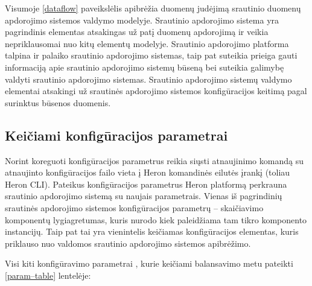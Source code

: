 \documentclass{VUMIFPSbakalaurinis}
\begin{document}
Visumoje \ref{dataflow} paveikslėlis apibrėžia duomenų judėjimą srautinio duomenų apdorojimo sistemos valdymo modelyje. Srautinio apdorojimo sistema yra pagrindinis elementas atsakingas už patį duomenų apdorojimą ir veikia nepriklausomai nuo kitų elementų modelyje. Srautinio apdorojimo platforma talpina ir palaiko srautinio apdorojimo sistemas, taip pat suteikia prieiga gauti informaciją apie srautinio apdorojimo sistemų būseną bei suteikia galimybę valdyti srautinio apdorojimo sistemas. Srautinio apdorojimo sistemų valdymo elementai atsakingi už srautinės apdorojimo sistemos konfigūracijos keitimą pagal surinktus būsenos duomenis.

\subsection{Keičiami konfigūracijos parametrai}

Norint koreguoti konfigūracijos parametrus reikia siųsti atnaujinimo komandą su atnaujinto konfigūracijos failo vieta į Heron komandinės eilutės įrankį (toliau Heron CLI). Pateikus konfigūracijos parametrus Heron platformą perkrauna srautinio apdorojimo sistemą su naujais parametrais. 
Vienas iš pagrindinių srautinės apdorojimo sistemos konfigūracijos parametrų – skaičiavimo komponentų lygiagretumas, kuris nurodo kiek paleidžiama tam tikro komponento instancijų. Taip pat tai yra vienintelis keičiamas konfigūracijos elementas, kuris priklauso nuo valdomos srautinio apdorojimo sistemos apibrėžimo.

Visi kiti konfigūravimo parametrai \cite{configDocument}, kurie keičiami balansavimo metu pateikti \ref{param–table} lentelėje:
\end{document}
